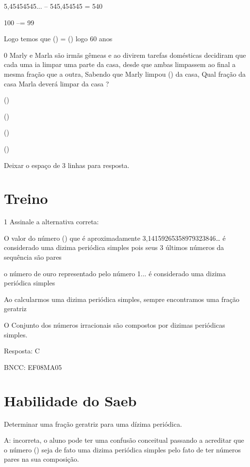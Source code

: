 5,45454545... -- 545,454545 = 540

100 --\times = 99

Logo temos que () = () logo 60 anos

\num{0} Marly e Marla são irmãs gêmeas e ao divirem tarefas domésticas
decidiram que cada uma ia limpar uma parte da casa, desde que ambas
limpassem ao final a mesma fração que a outra, Sabendo que Marly limpou
() da casa, Qual fração da casa Marla deverá limpar da casa
?

\item ()
\item ()
\item ()
\item ()

Deixar o espaço de 3 linhas para resposta.

\section{Treino}

\num{1} Assinale a alternativa correta:

\item O valor do número (\pi) que é aproximadamente
3,14159265358979323846\ldots{} é considerado uma dizima periódica
simples pois seus 3 últimos números da sequência são pares

\item o número de ouro representado pelo número 1... é considerado
uma dizima periódica simples

\item Ao calcularmos uma dizima periódica simples, sempre encontramos uma
fração geratriz

\item O Conjunto dos números irracionais são compostos por dizimas
periódicas simples.

Resposta: C

BNCC: EF08MA05

\section{Habilidade do Saeb}

Determinar uma fração geratriz para uma dízima periódica.

A: incorreta, o aluno pode ter uma confusão conceitual passando a
acreditar que o número (\pi) seja de fato uma dizima periódica simples
pelo fato de ter números pares na sua composição.

